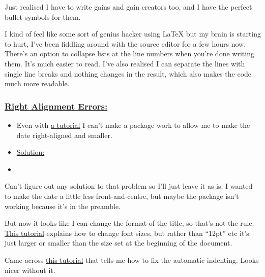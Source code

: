 \documentclass[12pt]{article}
\begin{document}
Just realised I have to write gains and gain creators too, and I have the perfect bullet symbols for them. 

I kind of feel like some sort of genius hacker using LaTeX but my brain is starting to hurt, I’ve been fiddling around with the source editor for a few hours now.
There’s an option to collapse lists at the line numbers when you’re done writing them. It’s much easier to read. I’ve also realised I can separate the lines with single line breaks and nothing changes in the result, which also makes the code much more readable.

\subsubsection{\underline{Right Alignment Errors:}}\label{error:er4}
\begin{itemize}
    \item Even with \href{https://www.overleaf.com/learn/latex/Text_alignment#Right-justified_text}{a tutorial} I can’t make a package work to allow me to make the date right-aligned and smaller.
\end{itemize}
\begin{itemize}
\renewcommand{\labelitemi}{$\nobullet$}
\item \underline{Solution:}
\renewcommand{\labelitemi}{$\bullet$}
    \item 
\end{itemize}
    
Can’t figure out any solution to that problem so I’ll just leave it as is. I wanted to make the date a little less front-and-centre, but maybe the package isn’t working because it’s in the preamble.

But now it looks like I can change the format of the title, so that’s not the rule. \href{https://www.overleaf.com/learn/latex/Font_sizes,_families,_and_styles}{This tutorial} explains how to change font sizes, but rather than “12pt” etc it’s just larger or smaller than the size set at the beginning of the document.

Came across \href{https://www.overleaf.com/learn/latex/Paragraph_formatting#Reference_guide}{this tutorial} that tells me how to fix the automatic indenting. Looks nicer without it.
\end{document}
